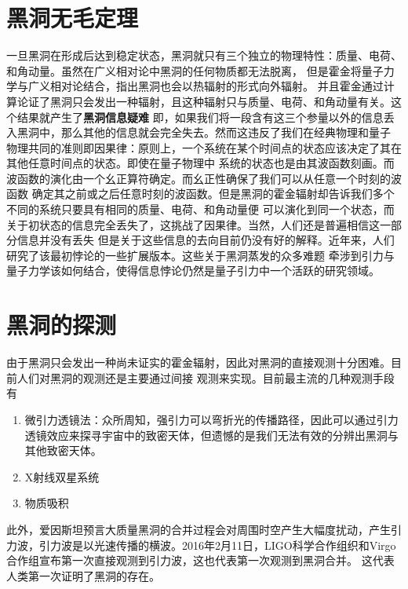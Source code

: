 \documentclass{article}
\begin{document}
\section{黑洞无毛定理}
一旦黑洞在形成后达到稳定状态，黑洞就只有三个独立的物理特性：质量、电荷、和角动量。虽然在广义相对论中黑洞的任何物质都无法脱离，
但是霍金将量子力学与广义相对论结合，指出黑洞也会以热辐射的形式向外辐射。
并且霍金通过计算论证了黑洞只会发出一种辐射，且这种辐射只与质量、电荷、和角动量有关。这个结果就产生了\textbf{\cusong 黑洞信息疑难}
即，如果我们将一段含有这三个参量以外的信息丢入黑洞中，那么其他的信息就会完全失去。然而这违反了我们在经典物理和量子
物理共同的准则即因果律：原则上，一个系统在某个时间点的状态应该决定了其在其他任意时间点的状态。即使在量子物理中
系统的状态也是由其波函数刻画。而波函数的演化由一个幺正算符确定。而幺正性确保了我们可以从任意一个时刻的波函数
确定其之前或之后任意时刻的波函数。但是黑洞的霍金辐射却告诉我们多个不同的系统只要具有相同的质量、电荷、和角动量便
可以演化到同一个状态，而关于初状态的信息完全丢失了，这挑战了因果律。当然，人们还是普遍相信这一部分信息并没有丢失
但是关于这些信息的去向目前仍没有好的解释。近年来，人们研究了该最初悖论的一些扩展版本。这些关于黑洞蒸发的众多难题
牵涉到引力与量子力学该如何结合，使得信息悖论仍然是量子引力中一个活跃的研究领域。
\section{黑洞的探测}
由于黑洞只会发出一种尚未证实的霍金辐射，因此对黑洞的直接观测十分困难。目前人们对黑洞的观测还是主要通过间接
观测来实现。目前最主流的几种观测手段有
\begin{enumerate}
    \item 微引力透镜法：众所周知，强引力可以弯折光的传播路径，因此可以通过引力透镜效应来探寻宇宙中的致密天体，但遗憾的是我们无法有效的分辨出黑洞与其他致密天体。
    \item X射线双星系统
    \item 物质吸积
\end{enumerate}
此外，爱因斯坦预言大质量黑洞的合并过程会对周围时空产生大幅度扰动，产生引力波，引力波是以光速传播的横波。2016年2月11日，LIGO科学合作组织和Virgo合作组宣布第一次直接观测到引力波，这也代表第一次观测到黑洞合并。
这代表人类第一次证明了黑洞的存在。
\end{document}

